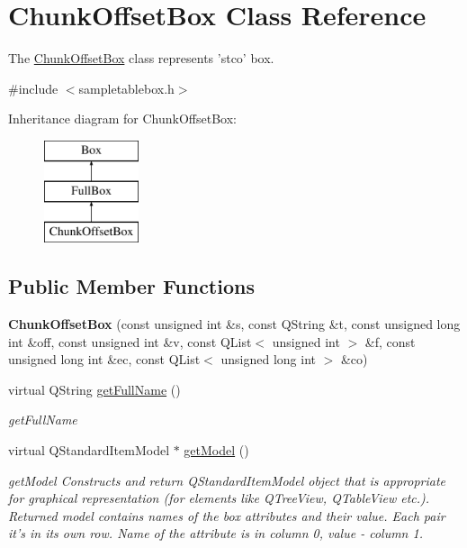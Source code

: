 \hypertarget{class_chunk_offset_box}{\section{Chunk\-Offset\-Box Class Reference}
\label{class_chunk_offset_box}
}


The \hyperlink{class_chunk_offset_box}{Chunk\-Offset\-Box} class represents 'stco' box.  




{\ttfamily \#include $<$sampletablebox.\-h$>$}

Inheritance diagram for Chunk\-Offset\-Box\-:\begin{figure}[H]
\begin{center}
\leavevmode
\includegraphics[height=3.000000cm]{class_chunk_offset_box}
\end{center}
\end{figure}
\subsection*{Public Member Functions}
\begin{DoxyCompactItemize}
\item 
\hypertarget{class_chunk_offset_box_ab93bc12a88d80409d4c830e5f5bc71e3}{{\bfseries Chunk\-Offset\-Box} (const unsigned int \&s, const Q\-String \&t, const unsigned long int \&off, const unsigned int \&v, const Q\-List$<$ unsigned int $>$ \&f, const unsigned long int \&ec, const Q\-List$<$ unsigned long int $>$ \&co)}\label{class_chunk_offset_box_ab93bc12a88d80409d4c830e5f5bc71e3}

\item 
virtual Q\-String \hyperlink{class_chunk_offset_box_a1c26ce6ada45f85c65761ed27f382848}{get\-Full\-Name} ()
\begin{DoxyCompactList}\small\item\em get\-Full\-Name \end{DoxyCompactList}\item 
virtual Q\-Standard\-Item\-Model $\ast$ \hyperlink{class_chunk_offset_box_aa9dfe2b91c236fca8b311c34d1b0a053}{get\-Model} ()
\begin{DoxyCompactList}\small\item\em get\-Model Constructs and return Q\-Standard\-Item\-Model object that is appropriate for graphical representation (for elements like Q\-Tree\-View, Q\-Table\-View etc.). Returned model contains names of the box attributes and their value. Each pair it's in its own row. Name of the attribute is in column 0, value -\/ column 1. \end{DoxyCompactList}\end{DoxyCompactItemize}
